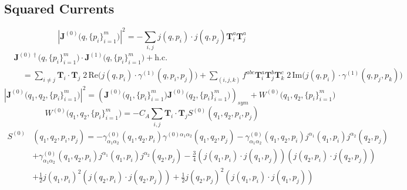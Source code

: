 \documentclass[a4paper,11pt]{article}
\begin{document}
\subsection{Squared Currents}
\begin{equation}
|\mathbf{J}^{(0)}\big( q,\{ p_i \}_{i=1}^m \big)|^2 = -\sum_{i,j} j(q, p_i) \cdot j(q, p_j) \mathbf{T}_i^a \mathbf{T}_j^a
\end{equation}
\begin{equation}
\begin{split}
&\mathbf{J}^{(0)\dagger} \big( q,\{ p_i \}_{i=1}^m \big) \cdot \mathbf{J}^{(1)}\big( q,\{ p_i \}_{i=1}^m \big) + \text{h.c.} \\
& \quad =  \sum_{i \neq j} \mathbf{T}_i \cdot \mathbf{T}_j \; 2 \, \text{Re}\big(j(q, p_i) \cdot \gamma^{(1)} (q, p_i, p_j)  \big)   + \sum_{(i,j,k)} f^{abc} \mathbf{T}_i^a \mathbf{T}_j^b \mathbf{T}_k^c \; 2 \, \text{Im} \big( j(q, p_i) \cdot \gamma^{(1)}(q, p_j, p_k) \big)
\end{split}
\end{equation}
%
\begin{equation}
|\mathbf{J}^{(0)} \big(q_1, q_2, \{ p_i \}_{i=1}^m \big)|^2 = \left(\mathbf{J}^{(0)}\big(q_1, \{ p_i \}_{i=1}^m \big) \mathbf{J}^{(0)}\big(q_2, \{ p_i \}_{i=1}^m \big) \right)_{sym} + W^{(0)}\big(q_1, q_2, \{ p_i \}_{i=1}^m \big)
\end{equation}
%
\begin{equation}
W^{(0)}\big(q_1, q_2, \{ p_i \}_{i=1}^m \big) = - C_A \sum_{i, j} \mathbf{T}_i \cdot \mathbf{T}_j S^{(0)}(q_1, q_2, p_i, p_j)
\end{equation}
%
\begin{equation}
\begin{split}
S^{(0)}&(q_1, q_2, p_i, p_j) = - \gamma^{(0)}_{\alpha_1 \alpha_2}(q_1, q_2, p_i) \gamma^{(0)\alpha_1 \alpha_2} (q_1, q_2, p_j) - \gamma^{(0)}_{\alpha_1 \alpha_2} (q_1, q_2, p_i) j^{\alpha_1}(q_1, p_i) j^{\alpha_2}(q_2, p_j) \\
& + \gamma^{(0)}_{\alpha_1 \alpha_2} (q_1, q_2, p_i) j^{\alpha_1}(q_1, p_i) j^{\alpha_2}(q_2, p_j) - \frac{3}{4} \left(j(q_1, p_i) \cdot j(q_1, p_j) \right) \left(j(q_2, p_i) \cdot j(q_2, p_j) \right) \\
& + \frac{1}{2} j(q_1, p_i)^2 \left( j(q_2, p_i) \cdot j(q_2, p_j) \right) + \frac{1}{2} j(q_2, p_j)^2 \left( j(q_1, p_i) \cdot j(q_1, p_j) \right)
\end{split}
\end{equation}
%
\end{document}

